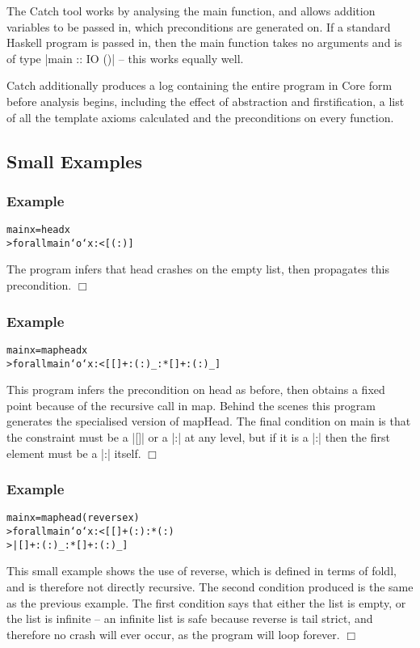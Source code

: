 \documentclass[preprint]{sigplanconf}
\newcommand{\C}[1]{\textsf{#1}}
\newcounter{exmp}
\newcommand{\yesexample}{\subsubsection*{Example \arabic{exmp}}\addtocounter{exmp}{1}}
\newcommand{\noexample}{\hfill$\Box$}
\newenvironment{code}{\begin{alltt}\small}{\end{alltt}}
\newenvironment{example}{\yesexample}{\noexample}
\begin{document}
The Catch tool works by analysing the \C{main} function, and allows addition variables to be passed in, which preconditions are generated on. If a standard Haskell program is passed in, then the \C{main} function takes no arguments and is of type |main :: IO ()| -- this works equally well.

Catch additionally produces a log containing the entire program in Core form before analysis begins, including the effect of abstraction and firstification, a list of all the template axioms calculated and the preconditions on every function.

\subsection{Small Examples}

\begin{example}
\begin{code}
main x = head x
> forall main `o` x :< [ (:) ]
\end{code}

The program infers that \C{head} crashes on the empty list, then propagates this precondition.
\end{example}

\begin{example}
\begin{code}
main x = map head x
> forall main `o` x :< [ [] + : (:) _ :* [] + : (:) _ ]
\end{code}

This program infers the precondition on \C{head} as before, then obtains a fixed point because of the recursive call in \C{map}. Behind the scenes this program generates the specialised version of \C{mapHead}. The final condition on \C{main} is that the constraint must be a |[]| or a |:| at any level, but if it is a |:| then the first element must be a |:| itself.
\end{example}

\begin{example}
\begin{code}
main x = map head (reverse x)
> forall main `o` x :<  [  [] + (:) :* (:)
>                       |  [] + : (:) _ :* [] + : (:) _]
\end{code}

This small example shows the use of \C{reverse}, which is defined in terms of \C{foldl}, and is therefore not directly recursive. The second condition produced is the same as the previous example. The first condition says that either the list is empty, or the list is infinite -- an infinite list is safe because \C{reverse} is tail strict, and therefore no crash will ever occur, as the program will loop forever.
\end{example}
\end{document}
